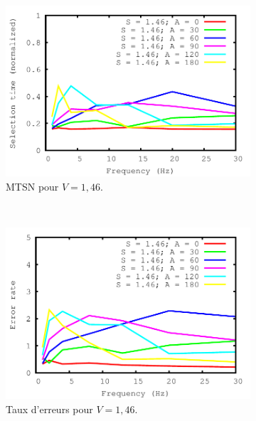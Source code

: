 \begin{figure}[!htb]
		~
		\begin{subfigure}[t]{\subImgWlineplot}
			\centering
			\includegraphics[width=\textwidth]{figures/ch4/frequency_speed_1_46_times}
			\caption{MTSN pour $V = 1,46$.}
			\label{fig:fEffect_t_146}
		\end{subfigure}
		~
		\begin{subfigure}[t]{\subImgWlineplot}
			\centering
			\includegraphics[width=\textwidth]{figures/ch4/frequency_speed_1_46_errors}
			\caption{Taux d'erreurs pour $V = 1,46$.}
			\label{fig:fEffect_e_146}
		\end{subfigure}
		~
		\begin{subfigure}[t]{\subImgWlineplot}
			\centering

\end{subfigure}
\end{figure}
